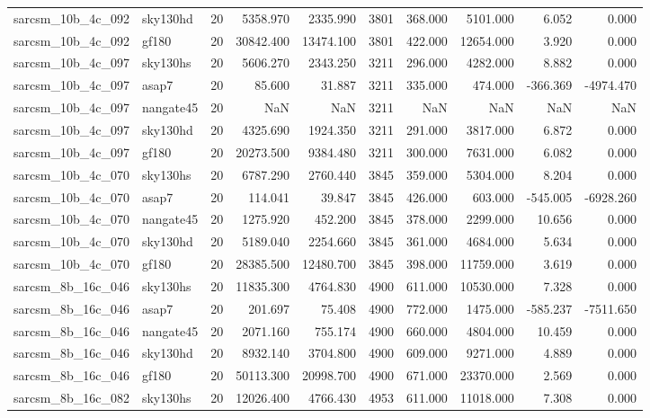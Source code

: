 \documentclass{article}
\begin{document}
\begin{longtable}{llrrrrrrrr}
sarcsm\_10b\_4c\_092 & sky130hd & 20 & 5358.970 & 2335.990 & 3801 & 368.000 & 5101.000 & 6.052 & 0.000 \\
sarcsm\_10b\_4c\_092 & gf180 & 20 & 30842.400 & 13474.100 & 3801 & 422.000 & 12654.000 & 3.920 & 0.000 \\
sarcsm\_10b\_4c\_097 & sky130hs & 20 & 5606.270 & 2343.250 & 3211 & 296.000 & 4282.000 & 8.882 & 0.000 \\
sarcsm\_10b\_4c\_097 & asap7 & 20 & 85.600 & 31.887 & 3211 & 335.000 & 474.000 & -366.369 & -4974.470 \\
sarcsm\_10b\_4c\_097 & nangate45 & 20 & NaN & NaN & 3211 & NaN & NaN & NaN & NaN \\
sarcsm\_10b\_4c\_097 & sky130hd & 20 & 4325.690 & 1924.350 & 3211 & 291.000 & 3817.000 & 6.872 & 0.000 \\
sarcsm\_10b\_4c\_097 & gf180 & 20 & 20273.500 & 9384.480 & 3211 & 300.000 & 7631.000 & 6.082 & 0.000 \\
sarcsm\_10b\_4c\_070 & sky130hs & 20 & 6787.290 & 2760.440 & 3845 & 359.000 & 5304.000 & 8.204 & 0.000 \\
sarcsm\_10b\_4c\_070 & asap7 & 20 & 114.041 & 39.847 & 3845 & 426.000 & 603.000 & -545.005 & -6928.260 \\
sarcsm\_10b\_4c\_070 & nangate45 & 20 & 1275.920 & 452.200 & 3845 & 378.000 & 2299.000 & 10.656 & 0.000 \\
sarcsm\_10b\_4c\_070 & sky130hd & 20 & 5189.040 & 2254.660 & 3845 & 361.000 & 4684.000 & 5.634 & 0.000 \\
sarcsm\_10b\_4c\_070 & gf180 & 20 & 28385.500 & 12480.700 & 3845 & 398.000 & 11759.000 & 3.619 & 0.000 \\
sarcsm\_8b\_16c\_046 & sky130hs & 20 & 11835.300 & 4764.830 & 4900 & 611.000 & 10530.000 & 7.328 & 0.000 \\
sarcsm\_8b\_16c\_046 & asap7 & 20 & 201.697 & 75.408 & 4900 & 772.000 & 1475.000 & -585.237 & -7511.650 \\
sarcsm\_8b\_16c\_046 & nangate45 & 20 & 2071.160 & 755.174 & 4900 & 660.000 & 4804.000 & 10.459 & 0.000 \\
sarcsm\_8b\_16c\_046 & sky130hd & 20 & 8932.140 & 3704.800 & 4900 & 609.000 & 9271.000 & 4.889 & 0.000 \\
sarcsm\_8b\_16c\_046 & gf180 & 20 & 50113.300 & 20998.700 & 4900 & 671.000 & 23370.000 & 2.569 & 0.000 \\
sarcsm\_8b\_16c\_082 & sky130hs & 20 & 12026.400 & 4766.430 & 4953 & 611.000 & 11018.000 & 7.308 & 0.000 \\

\end{longtable}
\end{document}
